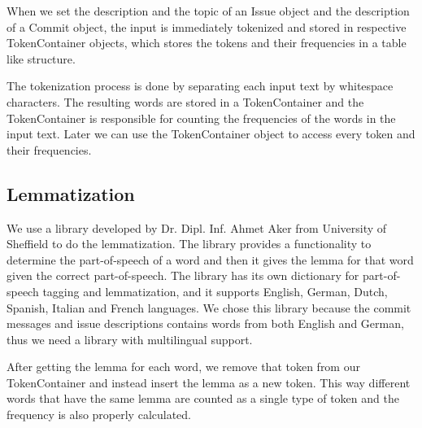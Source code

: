 When we set the description and the topic of an Issue object and the description of a Commit object, the input is immediately tokenized and stored in respective TokenContainer objects, which stores the tokens and their frequencies in a table like structure.

The tokenization process is done by separating each input text by whitespace characters. The resulting words are stored in a TokenContainer and the TokenContainer is responsible for counting the frequencies of the words in the input text. Later we can use the TokenContainer object to access every token and their frequencies.


\subsection{Lemmatization}

We use a library developed by Dr. Dipl. Inf. Ahmet Aker from University of Sheffield to do the lemmatization. The library provides a functionality to determine the part-of-speech of a word and then it gives the lemma for that word given the correct part-of-speech. The library has its own dictionary for part-of-speech tagging and lemmatization, and it supports English, German, Dutch, Spanish, Italian and French languages. We chose this library because the commit messages and issue descriptions contains words from both English and German, thus we need a library with multilingual support.

After getting the lemma for each word, we remove that token from our TokenContainer and instead insert the lemma as a new token. This way different words that have the same lemma are counted as a single type of token and the frequency is also properly calculated.

